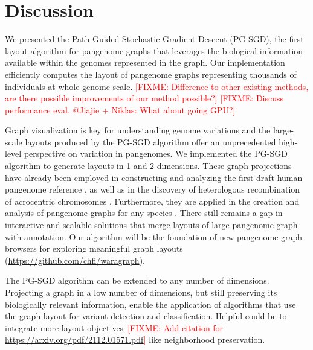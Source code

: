 \documentclass{bioinfo}
\theoremstyle{definition}
\newcommand{\red}[1]{{\textcolor{Red}{#1}}}
\newcommand{\FIXME}[1]{\red{[FIXME: #1]}}
\begin{document}
	\section{Discussion}
	\label{sec:discussion}
	
	We presented the Path-Guided Stochastic Gradient Descent (PG-SGD), the first layout algorithm for pangenome graphs that leverages the biological information available within the genomes represented in the graph.
	Our implementation efficiently computes the layout of pangenome graphs representing thousands of individuals at whole-genome scale.
	\FIXME{Difference to other existing methods, are there possible improvements of our method possible?}
	\FIXME{Discuss performance eval. @Jiajie + Niklas: What about going GPU?}
	
	Graph visualization is key for understanding genome variations and the large-scale layouts produced by the PG-SGD algorithm offer an unprecedented high-level perspective on variation in pangenomes.
	We implemented the PG-SGD algorithm to generate layouts in 1 and 2 dimensions.
	These graph projections have already been employed in constructing and analyzing the first draft human pangenome reference \citep{Liao2023}, as well as in the discovery of heterologous recombination of acrocentric chromosomes \citep{Guarracino2023}.
	Furthermore, they are applied in the creation and analysis of pangenome graphs for any species \citep{Guarracino2022, Garrison2023}.
	There still remains a gap in interactive and scalable solutions that merge layouts of large pangenome graph with annotation.
	Our algorithm will be the foundation of new pangenome graph browsers for exploring meaningful graph layouts (\href{https://github.com/chfi/waragraph}{https://github.com/chfi/waragraph}).
	
	The PG-SGD algorithm can be extended to any number of dimensions.
	Projecting a graph in a low number of dimensions, but still preserving its biologically relevant information, enable the application of algorithms that use the graph layout for variant detection and classification. 
	Helpful could be to integrate more layout objectives~\FIXME{Add citation for \url{https://arxiv.org/pdf/2112.01571.pdf}} like neighborhood preservation.
	
\end{document}

